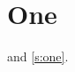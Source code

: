 \documentclass{article}
\begin{document}
\section{One}\label{s:one}
 and \vref{s:one}.
\end{document}
